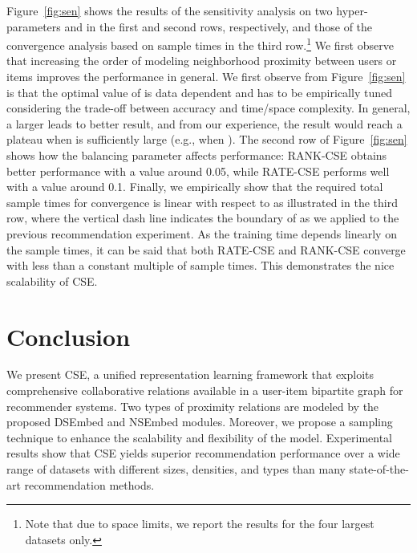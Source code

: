 \documentclass[sigconf,anonymous=false]{acmart}
\begin{document}
Figure~\ref{fig:sen} shows the results of the sensitivity analysis on two
hyper-parameters  and  in the first and second rows, respectively, and
those of the convergence analysis based on sample times in the third
row.\footnote{Note that due to space limits, we report the results for the 
four largest datasets only.}
We first observe that increasing the order  of modeling neighborhood proximity
between users or items improves the performance in general.
We first observe from Figure~\ref{fig:sen} is that the optimal value of  is data
dependent and has to be empirically tuned considering the trade-off between
accuracy and time/space complexity.
In general, a larger  leads to better result, and from our experience, the
result would reach a plateau when  is sufficiently large (e.g., when ).
The second row of Figure~\ref{fig:sen} shows how the balancing parameter  affects
performance: RANK-CSE obtains better performance with a value around 0.05,
while RATE-CSE performs well with a value around 0.1. 
Finally, we empirically show that the required total sample times for 
convergence is linear with respect to  as illustrated in the third row,
where the vertical dash line indicates the boundary of  as
we applied to the previous recommendation experiment.
As the training time depends linearly on the sample times, it can be said
that both RATE-CSE and RANK-CSE converge with less than a constant multiple
of  sample times. This demonstrates the nice scalability of CSE.

\section{Conclusion}\label{sec:conclude}

We present CSE, a unified representation learning framework that exploits
comprehensive collaborative relations available in a user-item bipartite graph
for recommender systems.
Two types of proximity relations are modeled by the proposed DSEmbed and
NSEmbed modules. Moreover, we propose a sampling technique to enhance the
scalability and flexibility of the model.
Experimental results show that CSE yields superior recommendation
performance over a wide range of datasets with different sizes, densities,
and types than many state-of-the-art recommendation methods.



\end{document}
